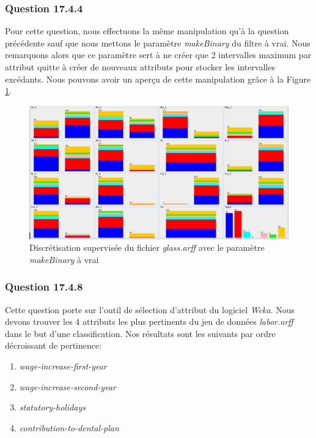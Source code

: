 \documentclass[11pt,a4paper]{article}
\begin{document}
			
			\subsubsection*{Question 17.4.4}
			
			Pour cette question, nous effectuons la même manipulation qu'à la question précédente sauf que nous mettons le paramètre \textit{makeBinary} du filtre à vrai. Nous remarquons alors que ce paramètre sert à ne créer que 2 intervalles maximum par attribut quitte à créer de nouveaux attributs pour stocker les intervalles excédants. Nous pouvons avoir un aperçu de cette manipulation grâce à la Figure \ref{fig:glass:disc:bin}.
			
			\begin{figure}[h]
				\centering
				\includegraphics[width=\textwidth]{glass_disc_bin}
				\caption{Discrétisation supervisée du fichier \textit{glass.arff} avec le paramètre \textit{makeBinary} à vrai}
				\label{fig:glass:disc:bin}
			\end{figure}
			
			\subsubsection*{Question 17.4.8}
			
			Cette question porte sur l'outil de sélection d'attribut du logiciel \textit{Weka}. Nous devons trouver les 4 attributs les plus pertinents du jeu de données \textit{labor.arff} dans le but d'une classification. Nos résultats sont les suivants par ordre décroissant de pertinence:
			
			\begin{enumerate}
				\item \textit{wage-increase-first-year}
				\item \textit{wage-increase-second-year}
				\item \textit{statutory-holidays}
				\item \textit{contribution-to-dental-plan}
			\end{enumerate}
			
\end{document}
